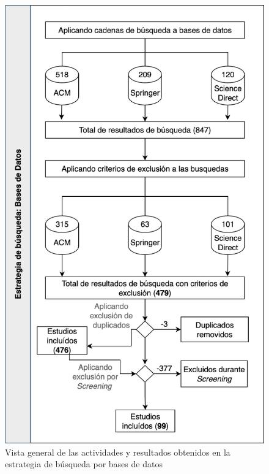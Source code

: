 \begin{figure}[htbp]
    \centering
    \includegraphics[scale=0.25]{resources/figures/overview.png}
    \caption{Vista general de las actividades y resultados obtenidos en la estrategia de búsqueda por bases de datos}
    \label{fig:overview}
\end{figure}


